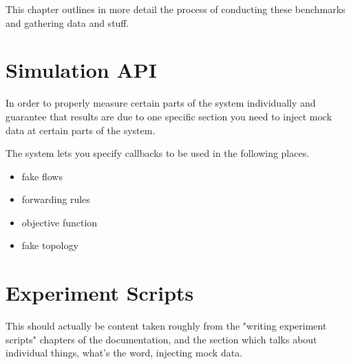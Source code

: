 This chapter outlines in more detail the process of conducting these benchmarks and gathering data and stuff.

\section{Simulation API}
In order to properly measure certain parts of the system individually and guarantee that results are due to one specific section you need to inject mock data at certain parts of the system.

The system lets you specify callbacks to be used in the following places.

\begin{itemize}
\item fake flows
\item forwarding rules
\item objective function
\item fake topology
\end{itemize}

\section{Experiment Scripts}
This should actually be content taken roughly from the "writing experiment scripts" chapters of the documentation, and the section which talks about individual things, what's the word, injecting mock data.
